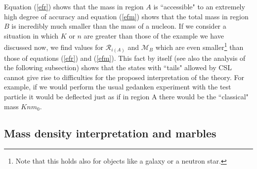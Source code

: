 \documentclass[12pt]{article}
\begin{document}
Equation (\ref{efr}) shows that the mass in region $A$ is
``accessible" to an extremely high degree of accuracy and equation
(\ref{efm}) shows that the total mass in region $B$ is incredibly
much smaller than the mass of a nucleon. If we consider a
situation in which $K$ or $n$ are greater than those of the
example we have discussed now, we find values for ${\mathcal
R}_{i(A)}$ and ${\mathcal M}_{B}$ which are even
smaller\footnote{Note that this holds also for objects like a
galaxy or a neutron star.} than those of equations (\ref{efr}) and
(\ref{efm}). This fact by itself (see also the analysis of the
following subsection) shows that the states with ``tails" allowed
by CSL cannot give rise to difficulties for the proposed
interpretation of the theory. For example, if we would perform the
usual gedanken experiment with the test particle it would be
deflected just as if in region A there would be the ``classical"
mass $Knm_{0}$.

\subsection{Mass density interpretation and marbles} \label{sec134}
\end{document}
